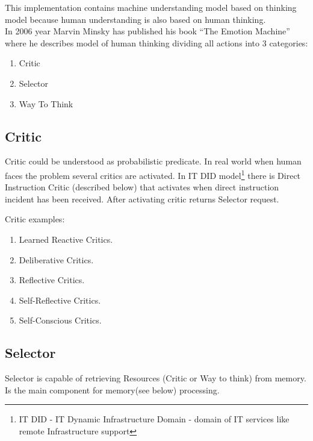 \documentclass[runningheads,a4paper]{llncs}
\begin{document}
This implementation contains machine understanding model based on thinking model because human understanding is also based on human thinking. \\
In 2006 year Marvin Minsky has published his book “The Emotion Machine” where he describes model of human thinking dividing all actions into 3 categories:

\begin{enumerate}
 \item Critic
 \item Selector
 \item Way To Think
\end{enumerate}

\subsection{Critic}
Critic could be understood as probabilistic predicate. In real world when human faces the problem several critics are activated. In IT DID model\footnote{IT DID - IT Dynamic Infrastructure Domain - domain of IT services like remote Infrastructure support} there is Direct Instruction Critic (described below) that activates when direct instruction incident has been received. After activating critic returns Selector request.

Critic examples:

\begin{enumerate}
 \item Learned Reactive Critics.
 \item Deliberative Critics.
 \item Reflective Critics.
 \item Self-Reflective Critics.
 \item Self-Conscious Critics.
\end{enumerate}

\subsection{Selector}
Selector is capable of retrieving Resources (Critic or Way to think) from memory. Is the main component for memory(see below) processing.
\end{document}
